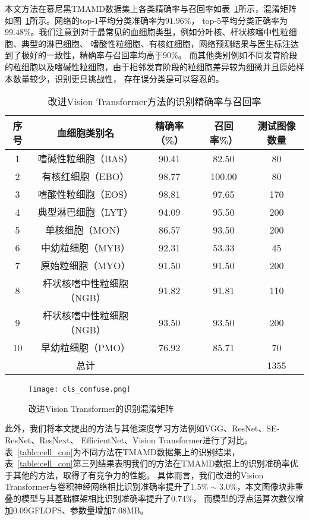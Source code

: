 本文方法在慕尼黑TMAMD数据集上各类精确率与召回率如表~\ref{table:cell_tmamd}所示，混淆矩阵如图~\ref{fig:cls_confuse}所示。网络的top-1平均分类准确率为$91.96\%$，
top-5平均分类正确率为$99.48\%$。我们注意到对于最常见的血细胞类型，例如分叶核、杆状核嗜中性粒细胞、典型的淋巴细胞、
嗜酸性粒细胞、有核红细胞，网络预测结果与医生标注达到了极好的一致性，精确率与召回率均高于$90\%$。
而其他类别例如不同发育阶段的粒细胞以及嗜碱性粒细胞，由于相邻发育阶段的粒细胞差异较为细微并且原始样本数量较少，识别更具挑战性，
存在误分类是可以容忍的。
\begin{table}
  \caption{改进Vision Transformer方法的识别精确率与召回率}   
  \centering 
  \label{table:cell_tmamd}
  \begin{tabular}{ccccc}
    \toprule[2pt]
    序号 & 血细胞类别名  &  精确率（\%） & 召回率\%） & 测试图像数量 \\
    \midrule[1.5pt] 
    1  & 嗜碱性粒细胞（BAS）      & 90.41 & 82.50 & 80 \\ 
    2  & 有核红细胞（EBO）        & 98.77 & 100.00 & 80   \\ 
    3  & 嗜酸性粒细胞（EOS）      & 98.81 & 97.65 & 170   \\ 
    4  & 典型淋巴细胞（LYT）      & 94.09 & 95.50 & 200   \\ 
    5  & 单核细胞（MON）          & 86.57 & 93.50 & 200   \\ 
    6  & 中幼粒细胞（MYB）        & 92.31 & 53.33 & 45  \\ 
    7  & 原始粒细胞（MYO）        & 91.50 & 91.50 & 200   \\ 
    8  & 杆状核嗜中性粒细胞（NGB） & 91.82 & 91.81 & 110   \\ 
    9  & 杆状核嗜中性粒细胞（NGB） & 93.50 & 93.50 & 200   \\  
    10 & 早幼粒细胞（PMO）        & 76.92 & 85.71 & 70  \\  
       & 总计                    &      &     & 1355   \\  
    \bottomrule[2pt]      
  \end{tabular} 
\end{table}

\begin{figure} 
   \centering   
   \texttt{[image: cls\_confuse.png]}   
   \caption{改进Vision Transformer的识别混淆矩阵}   
   \label{fig:cls_confuse} 
\end{figure}  

此外，我们将本文提出的方法与其他深度学习方法例如VGG\cite{2014Very}、ResNet\cite{he2016deep}、SE-ResNet\cite{hu2018squeeze}、ResNext\cite{xie2017aggregated}、
EfficientNet\cite{tan2019efficientnet}、Vision Transformer\cite{dosovitskiy2020image}进行了对比。
表~\ref{table:cell_con}为不同方法在TMAMD数据集上的识别结果，表~\ref{table:cell_con}第三列结果表明我们的方法在TMAMD数据上的识别准确率优于其他的方法，取得了有竞争力的性能。
具体而言，我们改进的Vision Transformer与卷积神经网络相比识别准确率提升了$1.5\% \sim 3.0\%$，本文图像块非重叠的模型与其基础框架相比识别准确率提升了$0.74\%$，
而模型的浮点运算次数仅增加$0.09$GFLOPS、参数量增加$7.08$MB。

